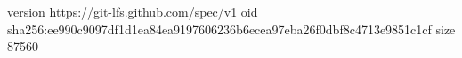 version https://git-lfs.github.com/spec/v1
oid sha256:ee990c9097df1d1ea84ea9197606236b6ecea97eba26f0dbf8c4713e9851c1cf
size 87560
